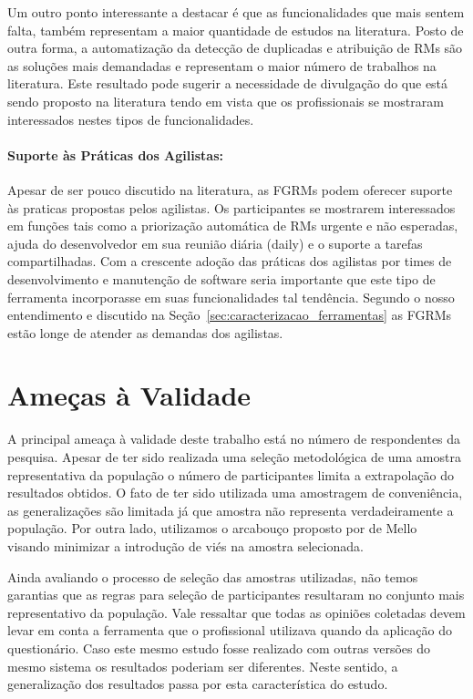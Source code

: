 Um outro ponto interessante a destacar é que as funcionalidades que mais sentem
falta, também representam a maior quantidade de estudos na literatura. Posto de
outra forma, a automatização da detecção de duplicadas e atribuição de RMs são
as soluções mais demandadas e representam o maior número de trabalhos na
literatura. Este resultado pode sugerir a necessidade de divulgação do que está
sendo proposto na literatura tendo em vista que os profissionais se mostraram
interessados nestes tipos de funcionalidades.

\paragraph{Suporte às Práticas dos Agilistas:}
\label{par:pesq_profissionais_suporte_pratica_agilistas}

Apesar de ser pouco discutido na literatura, as FGRMs podem oferecer suporte às
praticas propostas pelos agilistas. Os participantes se mostrarem interessados
em funções tais como a priorização automática de RMs urgente e não esperadas,
ajuda do desenvolvedor em sua reunião diária (daily) e o suporte a tarefas
compartilhadas. Com a crescente adoção das práticas dos agilistas por times de
desenvolvimento e manutenção de software seria importante que este tipo de
ferramenta incorporasse em suas funcionalidades tal tendência. Segundo o nosso
entendimento e discutido na Seção~\ref{sec:caracterizacao_ferramentas} as FGRMs
estão longe de atender as demandas dos agilistas.

\section{Ameças à Validade}
\label{sec:pesquisa_profissionais_ameacas_validade}

A principal ameaça à validade deste trabalho está no número de respondentes da
pesquisa. Apesar de ter sido realizada uma seleção metodológica de uma amostra
representativa da população o número de participantes limita a extrapolação do
resultados obtidos. O fato de ter sido utilizada uma amostragem de conveniência,
as generalizações são limitada já que amostra não representa verdadeiramente a
população. Por outra lado, utilizamos o arcabouço proposto por de
Mello~\cite{de2014towards} visando minimizar a introdução de viés na amostra
selecionada.

Ainda avaliando o processo de seleção das amostras utilizadas, não temos
garantias que as regras para seleção de participantes resultaram no conjunto
mais representativo da população. Vale ressaltar que todas as opiniões coletadas
devem levar em conta a ferramenta que o profissional utilizava quando da
aplicação do questionário. Caso este mesmo estudo fosse realizado com outras
versões do mesmo sistema os resultados poderiam ser diferentes. Neste sentido, a
generalização dos resultados passa por esta característica do estudo.

